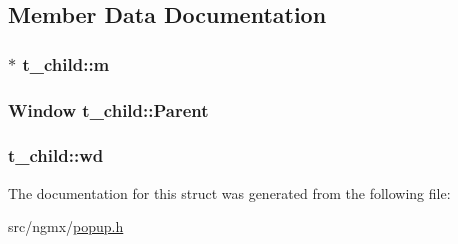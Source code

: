\subsection{\-Member \-Data \-Documentation}
\hypertarget{structt__child_a9ac6db48a671f0ae695e127db6ecd48c}{
\subsubsection[{m}]{$\ast$ {\bf t\-\_\-child\-::m}}}\label{structt__child_a9ac6db48a671f0ae695e127db6ecd48c}
\hypertarget{structt__child_a579c755a1dd897de157938a64a8db701}{
\subsubsection[{\-Parent}]{\setlength{\rightskip}{0pt plus 5cm}\-Window {\bf t\-\_\-child\-::\-Parent}}}\label{structt__child_a579c755a1dd897de157938a64a8db701}
\hypertarget{structt__child_a5beda9f3b6a10a0cc77ce00aef3370ea}{
\subsubsection[{wd}]{ {\bf t\-\_\-child\-::wd}}}\label{structt__child_a5beda9f3b6a10a0cc77ce00aef3370ea}


\-The documentation for this struct was generated from the following file\-:\begin{DoxyCompactItemize}
\item 
src/ngmx/\hyperlink{popup_8h}{popup.\-h}\end{DoxyCompactItemize}
